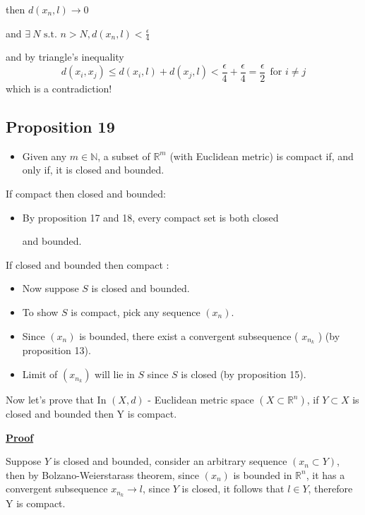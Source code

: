 \documentclass[12pt,a4paper]{article}
\begin{document}
\begin{enumerate}
    then \(d(x_{n},l) \to 0\)
    
    and \(\exists \ N \text{ s.t. } n > N, d(x_{n},l)<\frac{\epsilon}{4}\)  
    
    and by triangle's inequality \[d(x_{i},x_{j}) \leq d(x_{i},l) + d(x_{j},l) < \frac{\epsilon}{4} + \frac{\epsilon}{4} = \frac{\epsilon}{2} \ \ \text{for } i \neq j\]
    which is a contradiction!
\end{enumerate}

\subsection{Proposition 19}
\begin{itemize}
    \item Given any \(m \in \mathbb{N}\), a subset of \(\mathbb{R}^m\) (with Euclidean metric) is compact if, and only if, it is closed and bounded.
\end{itemize}
If compact then closed and bounded:
\begin{itemize}
    \item  By proposition 17 and 18, every compact set is both closed 
    
    and bounded.
\end{itemize}
If closed and bounded then compact :
\begin{itemize}
    \item Now suppose \(S\) is closed and bounded.
    \item To show \(S\) is compact, pick any sequence \(\left(x_n\right)\).
    \item Since \(\left(x_n\right)\) is bounded, there exist a convergent subsequence ( \(x_{n_k}\) ) (by proposition 13).
    \item Limit of \(\left(x_{n_k}\right)\) will lie in \(S\) since \(S\) is closed (by proposition 15).
\end{itemize}

Now let's prove that In \(\left( X,d \right)\) -  Euclidean metric space \((X \subset \mathbb{R}^n)\), if \(Y \subset X\) is closed and bounded then Y is compact. 

\underline{\textbf{Proof}}

Suppose \(Y\) is closed and bounded, consider an arbitrary sequence \(\left( x_{n} \subset Y \right) \), then by Bolzano-Weierstarass theorem, since \((x_{n})\) is bounded in \(\mathbb{R}^n\), it has a convergent subsequence \(x_{n_{k}} \to l\), since \(Y\) is closed, it follows that \(l \in Y\), therefore Y is compact.       
\end{document}
